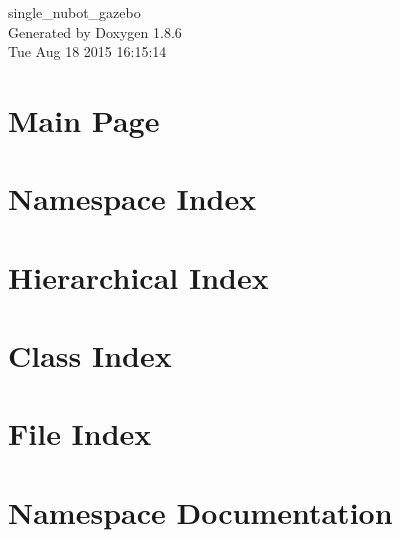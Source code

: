 \documentclass[twoside]{book}
\newcommand{\clearemptydoublepage}{%
  \newpage{\pagestyle{empty}\cleardoublepage}%
}
\begin{document}
\hypersetup{pageanchor=false}
\begin{titlepage}
\vspace*{7cm}
\begin{center}%
{\Large single\-\_\-nubot\-\_\-gazebo }\\
\vspace*{1cm}
{\large Generated by Doxygen 1.8.6}\\
\vspace*{0.5cm}
{\small Tue Aug 18 2015 16:15:14}\\
\end{center}
\end{titlepage}
\clearemptydoublepage
\tableofcontents
\clearemptydoublepage
{}
\hypersetup{pageanchor=true}

\chapter{Main Page}
\label{index}\hypertarget{index}{}
\chapter{Namespace Index}

\chapter{Hierarchical Index}

\chapter{Class Index}

\chapter{File Index}

\chapter{Namespace Documentation}





















\end{document}
